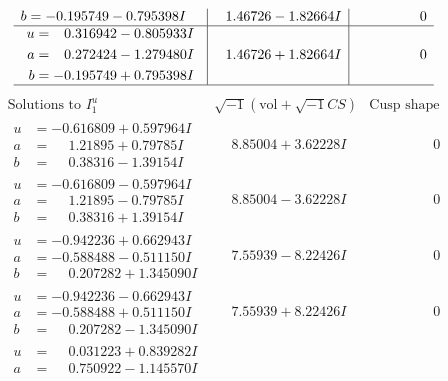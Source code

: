 \documentclass[1p]{elsarticle_modified}
\theoremstyle{definition}
\newcommand{\I}{\sqrt{-1}}
\begin{document}
$$\begin{array}{c|c|c}
\begin{aligned}
b &= -0.195749 - 0.795398 I\end{aligned}
 & \phantom{-}1.46726 - 1.82664 I & \phantom{-0.000000 } 0 \\ \hline\begin{aligned}
u &= \phantom{-}0.316942 - 0.805933 I \\
a &= \phantom{-}0.272424 - 1.279480 I \\
b &= -0.195749 + 0.795398 I\end{aligned}
 & \phantom{-}1.46726 + 1.82664 I & \phantom{-0.000000 } 0\\
 \hline 
 \end{array}$$\newpage$$\begin{array}{c|c|c}  
\text{Solutions to }I^u_{1}& \I (\text{vol} + \sqrt{-1}CS) & \text{Cusp shape}\\
 \hline 
\begin{aligned}
u &= -0.616809 + 0.597964 I \\
a &= \phantom{-}1.21895 + 0.79785 I \\
b &= \phantom{-}0.38316 - 1.39154 I\end{aligned}
 & \phantom{-}8.85004 + 3.62228 I & \phantom{-0.000000 } 0 \\ \hline\begin{aligned}
u &= -0.616809 - 0.597964 I \\
a &= \phantom{-}1.21895 - 0.79785 I \\
b &= \phantom{-}0.38316 + 1.39154 I\end{aligned}
 & \phantom{-}8.85004 - 3.62228 I & \phantom{-0.000000 } 0 \\ \hline\begin{aligned}
u &= -0.942236 + 0.662943 I \\
a &= -0.588488 - 0.511150 I \\
b &= \phantom{-}0.207282 + 1.345090 I\end{aligned}
 & \phantom{-}7.55939 - 8.22426 I & \phantom{-0.000000 } 0 \\ \hline\begin{aligned}
u &= -0.942236 - 0.662943 I \\
a &= -0.588488 + 0.511150 I \\
b &= \phantom{-}0.207282 - 1.345090 I\end{aligned}
 & \phantom{-}7.55939 + 8.22426 I & \phantom{-0.000000 } 0 \\ \hline\begin{aligned}
u &= \phantom{-}0.031223 + 0.839282 I \\
a &= \phantom{-}0.750922 - 1.145570 I \\

\end{aligned}
\end{array}$$
\end{document}
